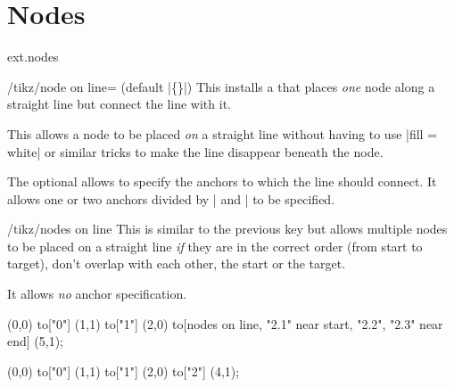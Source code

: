 %
%
%

\section{Nodes}
\begin{tikzlibrary}{ext.nodes}
\end{tikzlibrary}

\begin{stylekey}{/tikz/node on line= (default |\{\}|)}
This installs a  that places \emph{one}
node along a straight line but connect the line with it.

This allows a node to be placed \emph{on} a straight line without having to
use |fill = white| or similar tricks to make the line disappear 
beneath the node.

The optional  allows to specify the
anchors to which the line should connect.
It allows one or two anchors divided by | and | to be specified.
\end{stylekey}

\begin{stylekey}{/tikz/nodes on line}
This is similar to the previous key but allows
multiple nodes to be placed on a straight line
\emph{if} they are in the correct order (from start to target),
don't overlap with each other, the start or the target.

It allows \emph{no} anchor specification.
\end{stylekey}

\begin{codeexample}[preamble=\usetikzlibrary{ext.nodes, quotes}, width=7cm]
\tikz[inner sep=.15em, circle, nodes=draw, sloped]
   (0,0) to["0"] (1,1)
                                             to["1"] (2,0)
          to[nodes on line, "2.1" near start, "2.2", "2.3" near end] (5,1);
\end{codeexample}
\begin{codeexample}[preamble=\usetikzlibrary{ext.nodes, quotes}, width=7cm]
\tikz[inner sep=.15em, nodes=draw]
  \draw[thick, ->, node on line=west and east] (0,0) to["0"] (1,1)
                                                     to["1"] (2,0)
                                                     to["2"] (4,1);
\end{codeexample}

